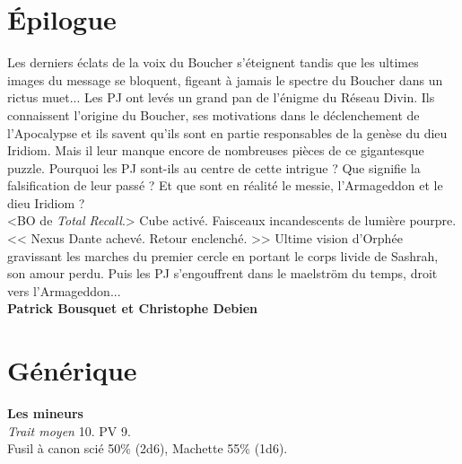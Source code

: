 \documentclass[11pt,twoside,a4paper]{book}
\begin{document}
\section*{{\'E}pilogue}

Les derniers {\'e}clats de la voix du Boucher s'{\'e}teignent tandis que les ultimes images du message se bloquent, figeant {\`a} jamais le spectre du Boucher dans un rictus muet... Les PJ ont lev{\'e}s un grand pan de l'{\'e}nigme du R{\'e}seau Divin. Ils connaissent l'origine du Boucher, ses motivations dans le d{\'e}clenchement de l'Apocalypse et ils savent qu'ils sont en partie responsables de la gen{\`e}se du dieu Iridiom. Mais il leur manque encore de nombreuses pi{\`e}ces de ce gigantesque puzzle. Pourquoi les PJ sont-ils au centre de cette intrigue ? Que signifie la falsification de leur pass{\'e} ? Et que sont en r{\'e}alit{\'e} le messie, l'Armageddon et le dieu Iridiom ?~\\

<BO de \emph{Total Recall}.> Cube activ{\'e}. Faisceaux incandescents de lumi{\`e}re pourpre. << Nexus Dante achev{\'e}. Retour enclench{\'e}. >> Ultime vision d'Orph{\'e}e gravissant les marches du premier cercle en portant le corps livide de Sashrah, son amour perdu. Puis les PJ s'engouffrent dans le maelstr{\"o}m du temps, droit vers l'Armageddon... ~\\

\textbf{Patrick Bousquet et Christophe Debien}~\\


\clearpage

\section*{G{\'e}n{\'e}rique}

\textbf{Les mineurs}~\\
\emph{Trait moyen} 10. PV 9.~\\
Fusil {\`a} canon sci{\'e} 50\% (2d6), Machette 55\% (1d6).~\\
\end{document}
